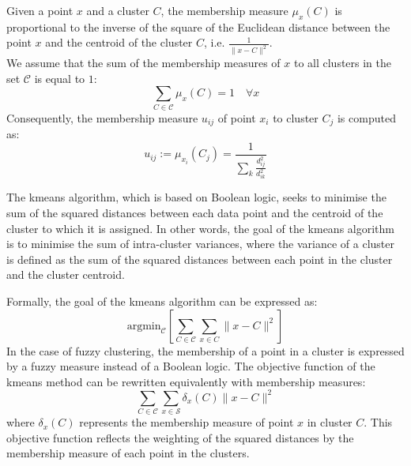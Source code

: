 \begin{definition}\label{def:fuzzy}
	Given a point $x$ and a cluster $C$, the membership measure $\mu_x(C)$ is proportional to the inverse of the square of the Euclidean distance between the point $x$ and the centroid of the cluster $C$, i.e. $\frac{1}{\|x-C\|^2}$.\\ We assume that the sum of the membership measures of $x$ to all clusters in the set $\mathcal{C}$ is equal to $1$:
	$$\sum_{C\in\mathcal{C}}\mu_x(C)=1 \quad \forall x$$
	Consequently, the membership measure $u_{ij}$ of point $x_i$ to cluster $C_j$ is computed as:
	$$u_{ij} := \mu_{x_i}(C_j) =  \frac{1}{\sum_{k}\frac{d^2_{ij}}{d^2_{ik}}}$$
\end{definition}
\begin{remark}
	The \gls{kmeans} algorithm, which is based on Boolean logic, seeks to minimise the sum of the squared distances between each data point and the centroid of the cluster to which it is assigned. In other words, the goal of the \gls{kmeans} algorithm is to minimise the sum of intra-cluster variances, where the variance of a cluster is defined as the sum of the squared distances between each point in the cluster and the cluster centroid.

	\noindent Formally, the goal of the \gls{kmeans} algorithm can be expressed as:
	\begin{equation*}
		\text{argmin}_\mathcal{C}\left[\sum_{C\in\mathcal{C}}\sum_{x \in C}\|x-C\|^2\right]
	\end{equation*}
	\noindent In the case of fuzzy clustering, the membership of a point in a cluster is expressed by a fuzzy measure instead of a Boolean logic. The objective function of the \gls{kmeans} method can be rewritten equivalently with membership measures:
	\begin{equation*}
		\sum_{C\in\mathcal{C}}\sum_{x \in \mathcal{S}}\delta_x(C)\|x-C\|^2
	\end{equation*}
	where $\delta_x(C)$ represents the membership measure of point $x$ in cluster $C$. This objective function reflects the weighting of the squared distances by the membership measure of each point in the clusters.
\end{remark}
